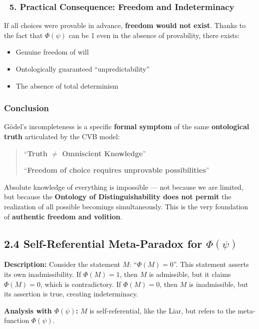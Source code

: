 \documentclass[12pt]{article}
\begin{document}
\subsubsection*{🔹 5. Practical Consequence: Freedom and Indeterminacy}

If all choices were provable in advance, \textbf{freedom would not exist}. Thanks to the fact that $\Phi(\psi)$ can be 1 even in the absence of provability, there exists:

\begin{itemize}
\item Genuine freedom of will
\item Ontologically guaranteed ``unpredictability''
\item The absence of total determinism
\end{itemize}

\subsubsection*{Conclusion}

Gödel’s incompleteness is a specific \textbf{formal symptom} of the same \textbf{ontological truth} articulated by the CVB model:

\begin{quote}
``\textbf{Truth $\neq$ Omniscient Knowledge}''

``\textbf{Freedom of choice requires unprovable possibilities}''
\end{quote}

Absolute knowledge of everything is impossible — not because we are limited, but because the \textbf{Ontology of Distinguishability does not permit} the realization of all possible becomings simultaneously. This is the very foundation of \textbf{authentic freedom and volition}.


\subsection*{2.4 Self-Referential Meta-Paradox for $\Phi(\psi)$}

\textbf{Description:}  
Consider the statement $M$: ``$\Phi(M) = 0$''. This statement asserts its own inadmissibility.  
If $\Phi(M) = 1$, then $M$ is admissible, but it claims $\Phi(M) = 0$, which is contradictory.  
If $\Phi(M) = 0$, then $M$ is inadmissible, but its assertion is true, creating indeterminacy.

\textbf{Analysis with $\Phi(\psi)$:}  
$M$ is self-referential, like the Liar, but refers to the meta-function $\Phi(\psi)$.
\end{document}
